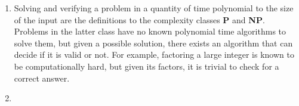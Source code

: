 \documentclass[12pt]{article}
\begin{document}
\begin{enumerate}
\begin{enumerate}
    \item Solving and verifying a problem in a quantity of time polynomial to the size of the input are the definitions to the complexity classes \textbf{P} and \textbf{NP}. Problems in the latter class have no known polynomial time algorithms to solve them, but given a possible solution, there exists an algorithm that can decide if it is valid or not. For example, factoring a large integer is known to be computationally hard, but given its factors, it is trivial to check for a correct answer.
    \item 
  \end{enumerate}
\end{enumerate}
\end{document}
